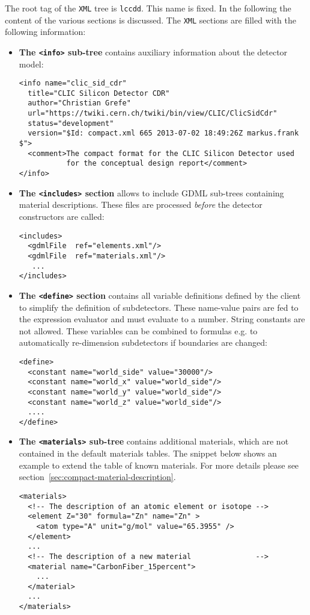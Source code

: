 The root tag of the \texttt{XML} tree is {\texttt{lccdd}}. This name is fixed. In the following the content of the various sections is discussed. The \texttt{XML} sections are filled with the following information:
\begin{itemize}
\item {\textbf{The \texttt{<info>} sub-tree}} contains auxiliary information about the detector model:
\begin{verbatim}
<info name="clic_sid_cdr"
  title="CLIC Silicon Detector CDR"
  author="Christian Grefe"
  url="https://twiki.cern.ch/twiki/bin/view/CLIC/ClicSidCdr"
  status="development"
  version="$Id: compact.xml 665 2013-07-02 18:49:26Z markus.frank $">
  <comment>The compact format for the CLIC Silicon Detector used 
           for the conceptual design report</comment>
</info>
\end{verbatim}

\item {\textbf{The \texttt{<includes>} section}} allows to include GDML sub-trees containing material descriptions. These files are processed {\textit{before}} the detector constructors are called:
\begin{verbatim}
<includes>
  <gdmlFile  ref="elements.xml"/>
  <gdmlFile  ref="materials.xml"/>
   ...
</includes>
\end{verbatim}

\item {\textbf{The \texttt{<define>} section}} contains all variable definitions defined by the client to simplify the definition of subdetectors. These name-value pairs are fed to the expression evaluator and must evaluate to a number. String constants are not allowed. These variables can be combined to formulas e.g. to automatically re-dimension subdetectors if boundaries are changed:
\begin{verbatim}
<define>
  <constant name="world_side" value="30000"/>
  <constant name="world_x" value="world_side"/>
  <constant name="world_y" value="world_side"/>
  <constant name="world_z" value="world_side"/>
  ....
</define>
\end{verbatim}

\item  {\textbf{The \texttt{<materials>} sub-tree}} contains additional materials, which are not contained in the default materials tables. The snippet below shows an example to extend the table of known materials. For more details please see section~\ref{sec:compact-material-description}.
\begin{verbatim}
<materials>
  <!-- The description of an atomic element or isotope -->
  <element Z="30" formula="Zn" name="Zn" >
    <atom type="A" unit="g/mol" value="65.3955" />
  </element>
  ...
  <!-- The description of a new material               -->
  <material name="CarbonFiber_15percent">
    ...
  </material>
  ...
</materials>
\end{verbatim}


\end{itemize}
